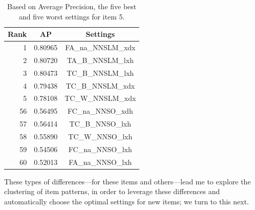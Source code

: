 \begin{table}[htb!]
\begin{center}
\begin{tabular}{|r|c|c|}
\hline
Rank & AP & Settings \\
\hline
\hline
1 & 0.80965 & FA\_na\_NNSLM\_xdx \\
\hline
2 & 0.80720 & TA\_B\_NNSLM\_lxh \\
\hline
3 & 0.80473 & TC\_B\_NNSLM\_lxh \\
\hline
4 & 0.79438 & TC\_B\_NNSLM\_xdx \\
\hline
5 & 0.78108 & TC\_W\_NNSLM\_xdx \\
\hline
\hline 
56 & 0.56495 & FC\_na\_NNSO\_xdh \\
\hline
57 & 0.56414 & TC\_B\_NNSO\_lxh \\
\hline
58 & 0.55890 & TC\_W\_NNSO\_lxh \\
\hline
59 & 0.54506 & FC\_na\_NNSO\_lxh \\
\hline
60 & 0.52013 & FA\_na\_NNSO\_lxh \\
\hline
\end{tabular}
\caption{Based on Average Precision, the five best and five worst settings for item 5.}
\label{tab:i05-dist-ranked-settings}
\end{center}
\end{table}

These types of differences---for these items and others---lead me to explore the clustering of item patterns, in order to
leverage these differences and automatically choose the optimal
settings for new items; we turn to this next.

